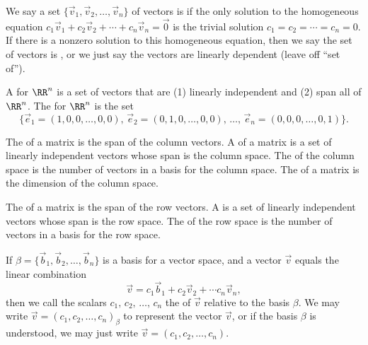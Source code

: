 \begin{definition} \label{def linear independence}
%
We say a set $\{\vec v_1,\vec v_2,\ldots,\vec v_n\}$ of vectors is  if the only solution to the homogeneous equation $c_1 \vec v_1+c_2\vec v_2+\cdots+c_n\vec v_n=\vec 0$ is the trivial solution $c_1=c_2=\cdots=c_n=0$. If there is a nonzero solution to this homogeneous equation, then we say the set of vectors is , or we just say the vectors are linearly dependent (leave off ``set of'').
\end{definition}

\begin{definition}[Basis]
\label{def:basis for Rn}
A  for $\RR^n$ is a set of vectors that are (1) linearly independent and (2) span all of $\RR^n$.
The  for $\RR^n$ is the set 
$$\{\vec e_1 = (1,0,0,\ldots,0,0),\, 
\vec e_2 = (0,1,0,\ldots,0,0),\, 
\ldots,\, 
\vec e_n = (0,0,0,\ldots,0,1)\}.$$
\end{definition}

\begin{definition} 
%
The  of a matrix is the span of the column vectors. 
A  of a matrix is a set of linearly independent vectors whose span is the column space. 
The  of the column space is the number of vectors in a basis for the column space. 
The  of a matrix is the dimension of the column space.
\end{definition}


\begin{definition} 
%
The  of a matrix is the span of the row vectors. 
A  is a set of linearly independent vectors whose span is the row space. 
The  of the row space is the number of vectors in a basis for the row space.
\end{definition}

\begin{definition}[Coordinates]
\label{def coordinates for Rn}
%
If $\beta=\{\vec b_1,\vec b_2,\ldots,\vec b_n\}$ is a basis for a vector space, and a vector $\vec v$ equals the linear combination 
$$ \vec v = c_1\vec b_1+c_2\vec v_2 + \cdots c_n\vec v_n, $$ then we call the scalars $c_1,\,c_2,\,\ldots,\, c_n$ the   of $\vec v$ relative to the basis $\beta$. We may write $\vec v = (c_1,c_2,\ldots, c_n)_\beta$ to represent the vector $\vec v$, or if the basis $\beta$ is understood, we may just write $\vec v = (c_1,c_2,\ldots, c_n)$.
\end{definition}

